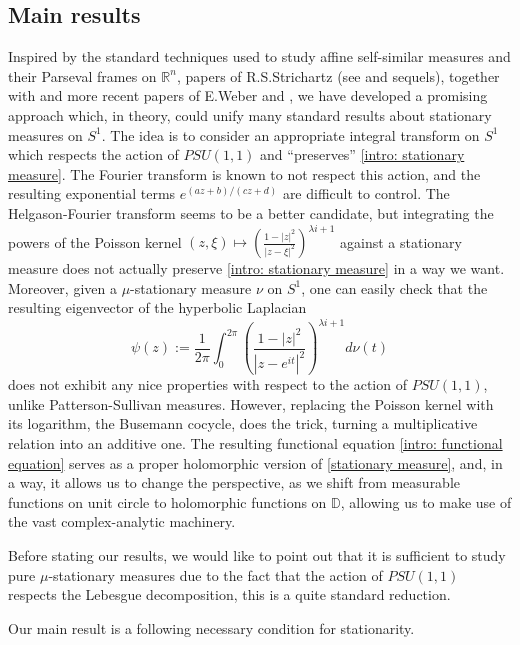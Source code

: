 \documentclass[11pt]{article}
\begin{document}
\subsection{Main results}
Inspired by the standard techniques used to study affine self-similar measures and their Parseval frames on $\mathbb{R}^n$, papers of R.S.Strichartz (see \cite{strichartzI} and sequels), together with \cite{denseanalytic} and more recent papers of E.Weber \cite{weber2017paleywiener} and \cite{axioms6020007}, we have developed a promising approach which, in theory, could unify many standard results about stationary measures on $S^1$. The idea is to consider an appropriate integral transform on $S^1$ which respects the action of $PSU(1,1)$ and ``preserves'' \eqref{intro: stationary measure}. The Fourier transform is known to not respect this action, and the resulting exponential terms $e^{(az +b) / (cz+d)}$ are difficult to control. The Helgason-Fourier transform seems to be a better candidate, but integrating the powers of the Poisson kernel $(z, \xi) \mapsto \left( \frac{1 - |z|^2}{|z - \xi|^2}\right)^{\lambda i + 1}$ against a stationary measure does not actually preserve \eqref{intro: stationary measure} in a way we want. Moreover, given a $\mu$-stationary measure $\nu$ on $S^1$, one can easily check that the resulting eigenvector of the hyperbolic Laplacian
\[
\psi(z) := \frac{1}{2\pi} \int_{0}^{2\pi} \left( \frac{1 - |z|^2}{|z - e^{i t}|^2}\right)^{\lambda i + 1} d\nu(t)
\]
does not exhibit any nice properties with respect to the action of $PSU(1,1)$, unlike Patterson-Sullivan measures. However, replacing the Poisson kernel with its logarithm, the Busemann cocycle, does the trick, turning a multiplicative relation into an additive one. The resulting functional equation \eqref{intro: functional equation} serves as a proper holomorphic version of \eqref{stationary measure}, and, in a way, it allows us to change the perspective, as we shift from measurable functions on unit circle to holomorphic functions on $\mathbb{D}$, allowing us to make use of the vast complex-analytic machinery.


Before stating our results, we would like to point out that it is sufficient to study pure $\mu$-stationary measures due to the fact that the action of $PSU(1,1)$ respects the Lebesgue decomposition, this is a quite standard reduction.

Our main result is a following necessary condition for stationarity.
\end{document}
